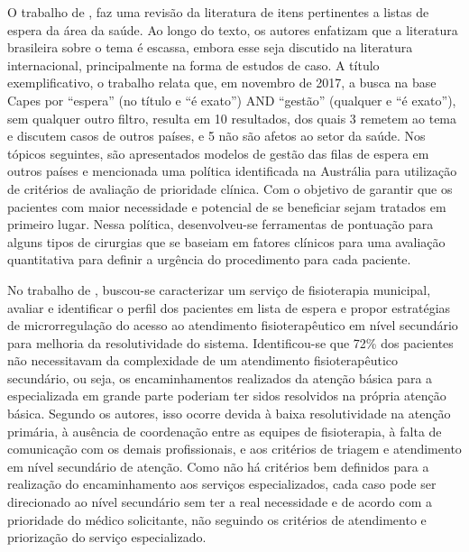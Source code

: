 O trabalho de , faz uma revisão da literatura de itens pertinentes a listas de espera da área da saúde. Ao longo do texto, os autores enfatizam que a literatura brasileira sobre o tema é escassa, embora esse seja discutido na literatura internacional, principalmente na forma de estudos de caso. A título exemplificativo, o trabalho relata que, em novembro de 2017, a busca na base Capes por “espera” (no título e “é exato”) AND “gestão” (qualquer e “é exato”), sem qualquer outro filtro, resulta em 10 resultados, dos quais 3 remetem ao tema e discutem casos de outros países, e 5 não são afetos ao setor da saúde. Nos tópicos seguintes, são apresentados modelos de gestão das filas de espera em outros países e mencionada uma política identificada na Austrália para utilização de critérios de avaliação de prioridade clínica. Com o objetivo de garantir que os pacientes com maior necessidade e potencial de se beneficiar sejam tratados em primeiro lugar. Nessa política, desenvolveu-se ferramentas de pontuação para alguns tipos de cirurgias que se baseiam em fatores clínicos para uma avaliação quantitativa para definir a urgência do procedimento para cada paciente.

No trabalho de ,  buscou-se caracterizar um serviço de fisioterapia municipal, avaliar e identificar o perfil dos pacientes em lista de espera e propor estratégias de microrregulação do acesso ao atendimento fisioterapêutico em nível secundário para melhoria da resolutividade do sistema. Identificou-se que 72\% dos pacientes não necessitavam da complexidade de um atendimento fisioterapêutico secundário, ou seja, os encaminhamentos realizados da atenção básica para a especializada em grande parte poderiam ter sidos resolvidos na própria atenção básica. Segundo os autores, isso ocorre devida à baixa  resolutividade na atenção primária, à ausência de coordenação entre as equipes de fisioterapia, à falta de comunicação com os demais profissionais, e aos critérios de triagem e atendimento em nível secundário de atenção. Como não há critérios bem definidos para a realização do encaminhamento aos serviços especializados, cada caso pode ser direcionado ao nível secundário sem ter a real necessidade e de acordo com a prioridade do médico solicitante, não seguindo os critérios de atendimento e priorização do serviço especializado.

